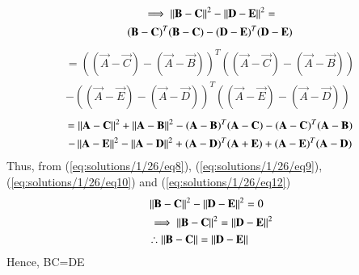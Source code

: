\begin{multline}
\implies \left\lVert\mathbf{B}-\mathbf{C}\right\rVert^2 - \left\lVert\mathbf{D}-\mathbf{E}\right\rVert^2=\\
(\mathbf B -\mathbf C)^T(\mathbf{B}-\mathbf{C})-(\mathbf D -\mathbf E)^T(\mathbf{D}-\mathbf{E})\label{eq:solutions/1/26/eq13}
\end{multline}
\begin{multline}
=((\vec A -\vec C)-(\vec A -\vec B))^T((\vec A -\vec C)-(\vec A -\vec B))\\-((\vec A -\vec E)-(\vec A -\vec D))^T((\vec A -\vec E)-(\vec A -\vec D))\label{eq:solutions/1/26/eq14}
\end{multline}
\begin{multline}
=\left\lVert\mathbf{A}-\mathbf{C}\right\rVert^2 + \left\lVert\mathbf{A}-\mathbf{B}\right\rVert^2- (\mathbf A -\mathbf B)^T(\mathbf{A}-\mathbf{C})-(\mathbf{A}-\mathbf{C})^T(\mathbf{A}-\mathbf{B})\\
-\left\lVert\mathbf{A}-\mathbf{E}\right\rVert^2 - \left\lVert\mathbf{A}-\mathbf{D}\right\rVert^2+ (\mathbf A -\mathbf D)^T(\mathbf{A}+\mathbf{E})+(\mathbf{A}-\mathbf{E})^T(\mathbf{A}-\mathbf{D})\label{eq:solutions/1/26/eq15}
\end{multline}
Thus, from (\ref{eq:solutions/1/26/eq8}), (\ref{eq:solutions/1/26/eq9}), (\ref{eq:solutions/1/26/eq10}) and (\ref{eq:solutions/1/26/eq12})
\begin{align}
& \left\lVert\mathbf{B}-\mathbf{C}\right\rVert^2 - \left\lVert\mathbf{D}-\mathbf{E}\right\rVert^2=0\label{eq:solutions/1/26/eq16}\\ 
& \implies \left\lVert\mathbf{B}-\mathbf{C}\right\rVert^2 = \left\lVert\mathbf{D}-\mathbf{E}\right\rVert^2 \label{eq:solutions/1/26/eq17}\\
	& \therefore\left\lVert\mathbf{B}-\mathbf{C}\right\rVert = \left\lVert\mathbf{D}-\mathbf{E}\right\rVert\label{eq:solutions/1/26/eq18}
\end{align}
Hence, BC=DE

